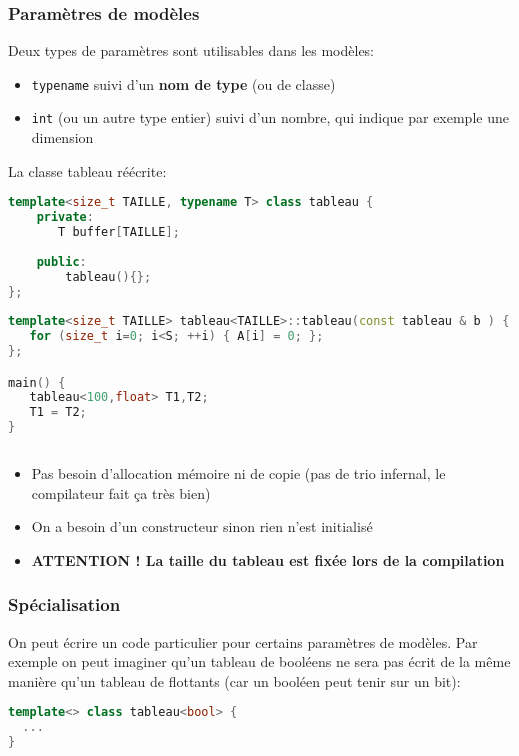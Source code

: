 \documentclass{beamer}
\begin{document}
\begin{frame}[fragile=singleslide,shrink=20]
\frametitle {Paramètres de modèles}

Deux types de paramètres sont utilisables dans les modèles:

\begin{itemize}
\item{\texttt{typename} suivi d'un \textbf{nom de type} (ou de classe) }
\item{\texttt{int} (ou un autre type entier) suivi d'un nombre, qui indique par exemple une dimension}
\end{itemize}

La classe tableau réécrite:
\begin{lstlisting}[language=c++]
template<size_t TAILLE, typename T> class tableau {
    private:
       T buffer[TAILLE];
    
    public:
        tableau(){};
};
    
template<size_t TAILLE> tableau<TAILLE>::tableau(const tableau & b ) {
   for (size_t i=0; i<S; ++i) { A[i] = 0; };
};

main() {
   tableau<100,float> T1,T2;
   T1 = T2;
}
   
\end{lstlisting}

\begin{itemize}
\item{Pas besoin d'allocation mémoire ni de copie (pas de trio infernal, le compilateur fait ça très bien)}
\item{On a besoin d'un constructeur sinon rien n'est initialisé}
\item{\textbf{ATTENTION ! La taille du tableau est fixée lors de la compilation}}
\end{itemize}
\end{frame}

\begin{frame}[fragile=singleslide,shrink=20]
\frametitle {Spécialisation}

On peut écrire un code particulier pour certains paramètres de modèles. Par exemple on peut imaginer qu'un tableau de booléens ne
sera pas écrit de la même manière qu'un tableau de flottants (car un booléen peut tenir sur un bit):

\begin{lstlisting}[language=c++]
template<> class tableau<bool> {
  ...
}
\end{lstlisting}

\end{frame}
\end{document}
